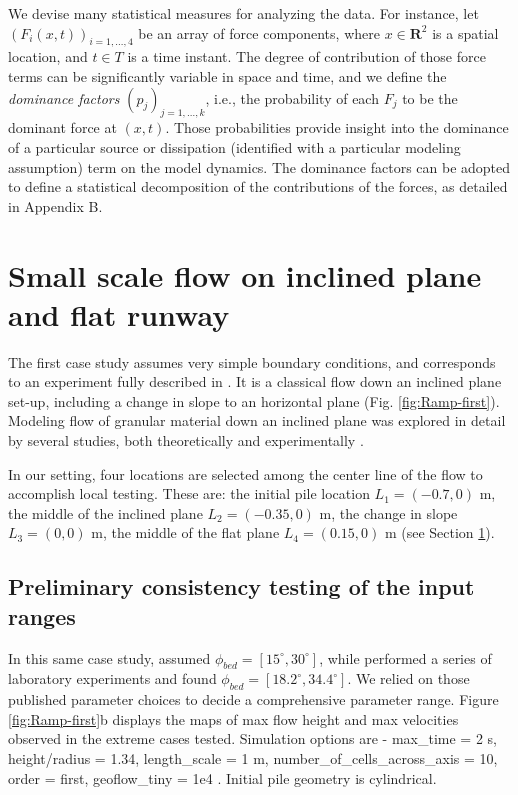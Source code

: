 \documentclass{article}
\begin{document}
We devise many statistical measures for analyzing the data. For instance, let $(F_i(x,t))_{i=1,\dots, 4}$ be an array of force components, where $x\in \mathbf R^2$ is a spatial location, and $t\in T$ is a time instant. The degree of contribution of those force terms can be significantly variable in space and time, and we define the \emph{dominance factors} $(p_j)_{j=1,\dots, k}$, i.e., the probability of each $F_j$ to be the dominant force at $(x,t)$. Those probabilities provide insight into the dominance of a particular source or dissipation (identified with a particular modeling assumption) term on the model dynamics. The dominance factors can be adopted to define a statistical decomposition of the contributions of the forces, as detailed in Appendix B.

\section{Small scale flow on inclined plane and flat runway}\label{sec:QoIs}
The first case study assumes very simple boundary conditions, and corresponds to an experiment fully described in \cite{Webb2004, Bursik2005, WebbBursik2016}. It is a classical flow down an inclined plane set-up, including a change in slope to an horizontal plane (Fig. \ref{fig:Ramp-first}). Modeling flow of granular material down an inclined plane was explored in detail by several studies, both theoretically and experimentally \citep{RuyerQuil2000, Silbert2001, Pitman2003b, DaCruz2005}.

In our setting, four locations are selected among the center line of the flow to accomplish local testing. These are: the initial pile location $L_1=(-0.7,0)$ m, the middle of the inclined plane $L_2=(-0.35,0)$ m, the change in slope $L_3=(0,0)$ m, the middle of the flat plane $L_4=(0.15,0)$ m (see Section \ref{sec:QoIs}).

\subsection{Preliminary consistency testing of the input ranges}\label{consistency}
In this same case study, \cite{Dalbey2008} assumed $\phi_{bed}=[15^\mathrm{\circ}, 30^\mathrm{\circ}]$, while \cite{WebbBursik2016} performed a series of laboratory experiments and found $\phi_{bed}=[18.2^\mathrm{\circ}, 34.4^\mathrm{\circ}]$. We relied on those published parameter choices to decide a comprehensive parameter range. Figure \ref{fig:Ramp-first}b displays the maps of max flow height and max velocities observed in the extreme cases tested. Simulation options are - max\_time = 2 s, height/radius = 1.34, length\_scale = 1 m, number\_of\_cells\_across\_axis = 10, order = first, geoflow\_tiny = 1e4 \citep{Patra2005,Aghakhani2016}. Initial pile geometry is cylindrical.
\end{document}
